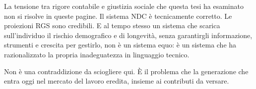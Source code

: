 La tensione tra rigore contabile e giustizia sociale che questa tesi ha
esaminato non si risolve in queste pagine.
Il sistema NDC è tecnicamente corretto.
Le proiezioni RGS sono credibili.
E al tempo stesso un sistema che scarica sull'individuo il rischio
demografico e di longevità, senza garantirgli informazione, strumenti
e crescita per gestirlo, non è un sistema equo: è un sistema che ha
razionalizzato la propria inadeguatezza in linguaggio tecnico.

Non è una contraddizione da sciogliere qui.
È il problema che la generazione che entra oggi nel mercato del lavoro
eredita, insieme ai contributi da versare.
